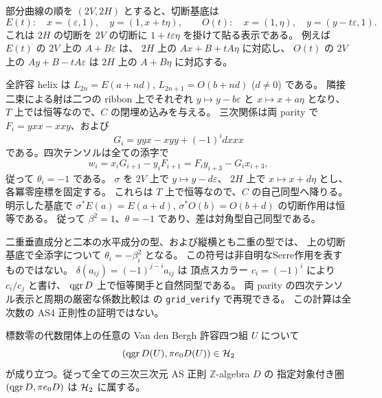 部分曲線の順を $(2V,2H)$ とすると、切断基底は
\[
 E(t):\quad x=(\varepsilon,1),\quad y=(1,x+t\eta),
 \qquad
 O(t):\quad x=(1,\eta),\quad y=(y-t\varepsilon,1).
\]
これは $2H$ の切断を $2V$ の切断に $1+t\varepsilon\eta$ を掛けて貼る表示である。
例えば $E(t)$ の $2V$ 上の $A+B\varepsilon$ は、
$2H$ 上の $Ax+B+tA\eta$ に対応し、
$O(t)$ の $2V$ 上の $Ay+B-tA\varepsilon$ は
$2H$ 上の $A+B\eta$ に対応する。

全許容 helix は $L_{2n}=E(a+nd)$,
$L_{2n+1}=O(b+nd)$ ($d\ne0$) である。
隣接二束による射は二つの ribbon 上でそれぞれ
$y\mapsto y-b\varepsilon$ と $x\mapsto x+a\eta$ となり、
$T$ 上では恒等なので、$C$ の閉埋め込みを与える。
三次関係は両 parity で $F_i=yxx-xxy$、および
\[
 G_i=yyx-xyy+(-1)^i dxxx
\]
である。四次テンソルは全ての添字で
\[
 w_i=x_iG_{i+1}-y_iF_{i+1}
     =F_i y_{i+3}-G_i x_{i+3},
\]
従って $\theta_i=-1$ である。
$\sigma$ を $2V$ 上で $y\mapsto y-d\varepsilon$、
$2H$ 上で $x\mapsto x+d\eta$ とし、各冪零座標を固定する。
これらは $T$ 上で恒等なので、$C$ の自己同型へ降りる。
明示した基底で $\sigma^*E(a)=E(a+d)$,
$\sigma^*O(b)=O(b+d)$ の切断作用は恒等である。
従って $\beta^2=1$、$\theta=-1$ であり、差は対角型自己同型である。

\begin{remark}
二重垂直成分と二本の水平成分の型、および縦横とも二重の型では、
上の切断基底で全添字について $\theta_i=-\beta_i^2$ となる。
この符号は非自明なSerre作用を表すものではない。
$\delta(a_{ij})=(-1)^{j-i}a_{ij}$ は
頂点スカラー $c_i=(-1)^i$ により $c_i/c_j$ と書け、
$\operatorname{qgr} D$ 上で恒等関手と自然同型である。
両 parity の四次テンソル表示と周期の厳密な係数比較は
 の
\texttt{grid\_verify} で再現できる。
この計算は全次数の AS4 正則性の証明ではない。
\end{remark}

\begin{theorem}[全許容四つ組からの逆構成]
\label{thm:all-admissible-inverse}
標数零の代数閉体上の任意の Van den Bergh 許容四つ組 $U$ について
\[
 (\operatorname{qgr} D(U),\pi e_0D(U))\in\mathcal H_2
\]
が成り立つ。従って全ての三次三次元 AS 正則 $\mathbb Z$-algebra $D$ の
指定対象付き圏 $(\operatorname{qgr} D,\pi e_0D)$ は $\mathcal H_2$ に属する。
\end{theorem}

